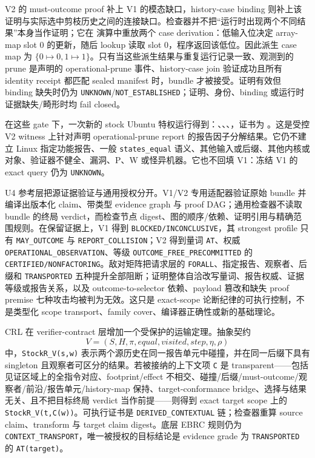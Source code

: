 \documentclass[
  11pt,
  a4paper,
]{ctexart}
\begin{document}
V2 的 must-outcome proof 补上 V1 的模态缺口，history-case binding
则补上该证明与实际选中剪枝历史之间的连接缺口。检查器并不把``运行时出现两个不同结果''本身当作证明；它在
 演算中重放两个 case
derivation：低输入位决定 array-map slot 0 的更新，随后 lookup 读取 slot
0，程序返回该低位。因此派生 case map 为
\(\{0\mapsto0,1\mapsto1\}\)。只有当这些派生结果与重复运行记录一致、观测到的
prune 是声明的 operational-prune 事件、history-case join 验证成功且所有
identity receipt 都匹配 sealed manifest 时，bundle 才被接受。证明有效但
binding 缺失时仍为
\texttt{UNKNOWN}/\texttt{NOT\_ESTABLISHED}；证明、身份、binding
或运行时证据缺失/畸形时均 fail closed。

在这些 gate 下，一次新的 stock Ubuntu 
特权运行得到：、、、，证书为
。这是受控
V2 witness 上针对声明 operational-prune report
的报告因子分解结果。它仍不建立 Linux 指定功能报告、一般
\texttt{states\_equal}
语义、其他输入或后缀、其他内核或对象、验证器不健全、漏洞、P、W
或怪异机器。它也不回填 V1：冻结 V1 的 exact query 仍为
\texttt{UNKNOWN}。

U4 参考层把源证据验证与通用授权分开。V1/V2 专用适配器验证原始 bundle
并编译出版本化 claim、带类型 evidence graph 与 proof
DAG；通用检查器不读取 bundle 的终局 verdict，而检查节点
digest、图的顺序/依赖、证明引用与精确范围规则。在保留证据上，V1 得到
\texttt{BLOCKED/INCONCLUSIVE}，其 strongest profile 只有
\texttt{MAY\_OUTCOME} 与 \texttt{REPORT\_COLLISION}；V2 得到量词
\texttt{AT}、权威 \texttt{OPERATIONAL\_OBSERVATION}、等级
\texttt{OUTCOME\_FREE\_PRECOMMITTED} 的
\texttt{CERTIFIED/NONFACTORING}。敌对矩阵把请求层的
\texttt{FORALL}、指定报告、观察者、后缀和 \texttt{TRANSPORTED}
五种提升全部阻断；证明整体自洽改写量词、报告权威、证据等级或报告关系，以及
outcome-to-selector 依赖、payload 篡改和缺失 proof premise
七种攻击均被判为无效。这只是 exact-scope
论断纪律的可执行控制，不是类型化 scope transport、family
cover、编译器正确性或新的基础理论。

CRL 在 verifier-contract 层增加一个受保护的运输定理。抽象契约
\[
V=(S,H,\pi,equal,visited,step,\eta,\rho)
\]
中，\texttt{StockR\_V(s,w)}
表示两个源历史在同一报告单元中碰撞，并在同一后缀下具有 singleton
且观察者可区分的结果。若被接纳的上下文项 \texttt{C} 是
transparent------包括见证区域上的全指令对应、footprint/effect
不相交、碰撞/后缀/must-outcome/观察者/前沿/报告单元/history-map
保持、target-conformance bridge、选择与结果无关、且不把目标终局 verdict
当作前提------则得到 exact target scope 上的
\texttt{StockR\_V(t,C(w))}。可执行证书是 \texttt{DERIVED\_CONTEXTUAL}
链；检查器重算 source claim、transform 与 target claim digest。底层 EBRC
规则仍为 \texttt{CONTEXT\_TRANSPORT}，唯一被授权的目标结论是 evidence
grade 为 \texttt{TRANSPORTED} 的 \texttt{AT(target)}。
\end{document}
